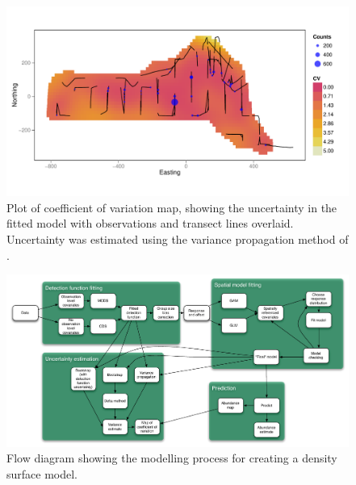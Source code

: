 \documentclass[a4paper,12pt]{article}
\begin{document}
\begin{figure}[h!]
  \caption{Plot of coefficient of variation map, showing the uncertainty in the fitted model with observations and transect lines overlaid. Uncertainty was estimated using the variance propagation method of \cite{WILLIAMS:2011in}.}
  \label{cv-plot}
  \begin{center}
    \includegraphics[width=\textwidth]{figs/cvplot-varprop}
  \end{center}
\end{figure}

\newpage

\begin{figure}[h!]
  \caption{Flow diagram showing the modelling process for creating a density surface model.}
  \label{flow}
  \begin{center}
    \includegraphics[width=\textwidth]{figs/flowdiagram-reduced}
  \end{center}
\end{figure}

\newpage
\end{document}
